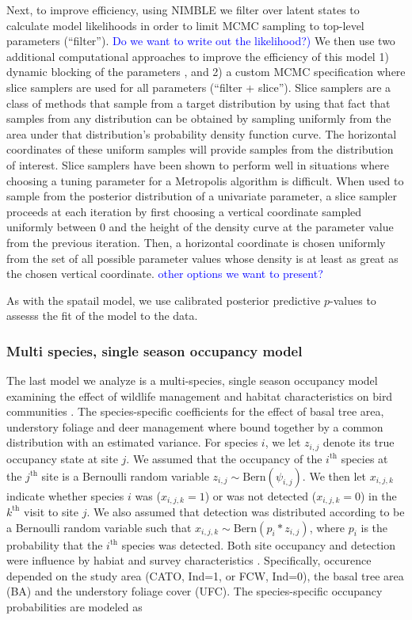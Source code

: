 \documentclass[12pt]{article}
\newcommand{\flagged}[1] {
  \textcolor{blue}{#1}
}
\begin{document}
Next, to improve efficiency, using NIMBLE we filter over latent states
to calculate model likelihoods in order to limit MCMC sampling to
top-level parameters (``filter''). \flagged{Do we want to write out
  the likelihood?)} We then use two additional computational
approaches to improve the efficiency of this model 1) dynamic blocking
of the parameters \citep[``filter + autoblocking'',
][]{turek2016efficient}, and 2) a custom MCMC specification where
slice samplers \citep{neal-03} are used for all parameters (``filter +
slice''). Slice samplers are a class of methods that sample from a
target distribution by using that fact that samples from any
distribution can be obtained by sampling uniformly from the area under
that distribution's probability density function curve.  The
horizontal coordinates of these uniform samples will provide samples
from the distribution of interest. Slice samplers have been shown to
perform well in situations where choosing a tuning parameter for a
Metropolis algorithm is difficult. When used to sample from the
posterior distribution of a univariate parameter, a slice sampler
proceeds at each iteration by first choosing a vertical coordinate
sampled uniformly between 0 and the height of the density curve at the
parameter value from the previous iteration.  Then, a horizontal
coordinate is chosen uniformly from the set of all possible parameter
values whose density is at least as great as the chosen vertical
coordinate.  \flagged{other options we want to present?}

As with the spatail model, we use calibrated posterior predictive
$p$-values \citep{hjort-etal-06} to assesss the fit of the model to
the data.

\subsubsection*{Multi species, single season occupancy model}
\label{sec:msss}

The last model we analyze is a multi-species, single season occupancy
model examining the effect of wildlife management and habitat
characteristics on bird communities \citep{zipkin2010multi}. The
species-specific coefficients for the effect of basal tree area,
understory foliage and deer management where bound together by a
common distribution with an estimated variance.  For species $i$, we
let $z_{i,j}$ denote its true occupancy state at site $j$. We assumed
that the occupancy of the $i^{\mathrm{th}}$ species at the
$j^{\mathrm{th}}$ site is a Bernoulli random variable $z_{i,j} \sim
\mathrm{Bern}(\psi_{i,j})$.  We then let $x_{i,j,k}$ indicate whether
species $i$ was ($x_{i,j,k}=1$) or was not detected ($x_{i,j,k}=0$) in
the $k^{\mathrm{th}}$ visit to site $j$. We also assumed that
detection was distributed according to be a Bernoulli random variable
such that $x_{i,j,k} \sim \mathrm{Bern}(p_{i}*z_{i,j})$, where $p_{i}$
is the probability that the $i^{\mathrm{th}}$ species was
detected. Both site occupancy and detection were influence by habiat
and survey characteristics \citep{zipkin2010multi}. Specifically,
occurence depended on the study area (CATO, Ind=1, or FCW, Ind=0), the
basal tree area (BA) and the understory foliage cover (UFC). The
species-specific occupancy probabilities are modeled as
\end{document}
